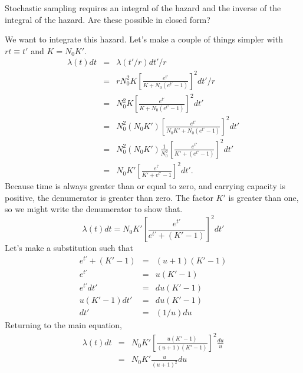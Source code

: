 \documentclass{article}
\begin{document}
Stochastic sampling requires an integral of the hazard
and the inverse of the integral of the hazard. Are these possible
in closed form?

We want to integrate this hazard. Let's make a couple of things simpler
with $rt\equiv t'$ and $K=N_0K'$.
\begin{eqnarray}
  \lambda(t)dt & = & \lambda(t'/r)dt'/r \\
  &=&rN_0^2K\left[
    \frac{e^{t'}}{K+N_0(e^{t'}-1)}\right]^2dt'/r \\
  &=&N_0^2K\left[
    \frac{e^{t'}}{K+N_0(e^{t'}-1)}\right]^2dt' \\
  &=&N_0^2(N_0K')\left[
    \frac{e^{t'}}{N_0K'+N_0(e^{t'}-1)}\right]^2dt' \\
  &=&N_0^2(N_0K')\frac{1}{N_0^2}\left[
    \frac{e^{t'}}{K'+(e^{t'}-1)}\right]^2dt' \\
  & = & N_0K'\left[\frac{e^{t'}}{K'+e^{t'}-1}\right]^2dt'.
\end{eqnarray}
Because time is always greater than or equal to zero, and carrying
capacity is positive, the denumerator is greater than zero.
The factor $K'$ is greater than one, so we might write the denumerator
to show that.
\begin{equation}
  \lambda(t)dt =N_0K'\left[\frac{e^{t'}}{e^{t'}+(K'-1)}\right]^2dt'
\end{equation}
Let's make a substitution such that
\begin{eqnarray}
  e^{t'}+(K'-1)& = & (u + 1)(K'-1) \\
  e^{t'} & = & u(K'-1) \\
  e^{t'}dt' & = & du(K'-1) \\
  u(K'-1)dt' & = & du(K'-1) \\
  dt' & = & (1/u)du
\end{eqnarray}
Returning to the main equation,
\begin{eqnarray}
  \lambda(t)dt & = & N_0K'\left[\frac{u(K'-1)}{(u+1)(K'-1)}\right]^2
      \frac{du}{u} \\
  & = & N_0K'\frac{u}{(u+1)^2}du \\
\end{eqnarray}
\end{document}
